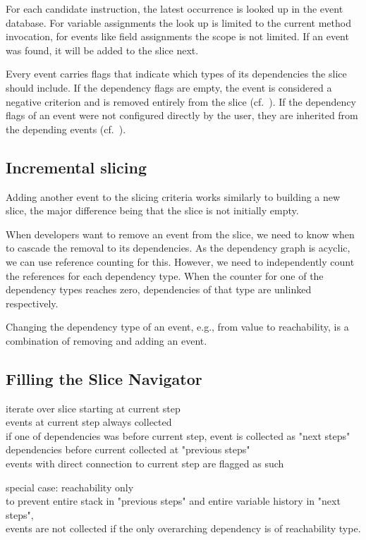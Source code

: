 ﻿\documentclass[
      english,
			conference,
      ]{IEEEtran}
\begin{document}
For each candidate instruction, the latest occurrence is looked up in the event database.
For variable assignments the look up is limited to the current method invocation, for events like field assignments the scope is not limited.
If an event was found, it will be added to the slice next.

Every event carries flags that indicate which types of its dependencies the slice should include.
If the dependency flags are empty, the event is considered a negative criterion and is removed entirely from the slice (cf.~).
If the dependency flags of an event were not configured directly by the user, they are inherited from the depending events (cf.~).

\subsection{Incremental slicing}

Adding another event to the slicing criteria works similarly to building a new slice, the major difference being that the slice is not initially empty.

When developers want to remove an event from the slice, we need to know when to cascade the removal to its dependencies.
As the dependency graph is acyclic, we can use reference counting for this.
However, we need to independently count the references for each dependency type.
When the counter for one of the dependency types reaches zero, dependencies of that type are unlinked respectively.

Changing the dependency type of an event, e.g., from value to reachability, is a combination of removing and adding an event.

\subsection{Filling the Slice Navigator}


iterate over slice starting at current step \\
events at current step always collected \\
if one of dependencies was before current step, event is collected as "next steps" \\
dependencies before current collected at "previous steps" \\
events with direct connection to current step are flagged as such

special case: reachability only \\
to prevent entire stack in "previous steps" and entire variable history in "next steps", \\
events are not collected if the only overarching dependency is of reachability type.
\end{document}
